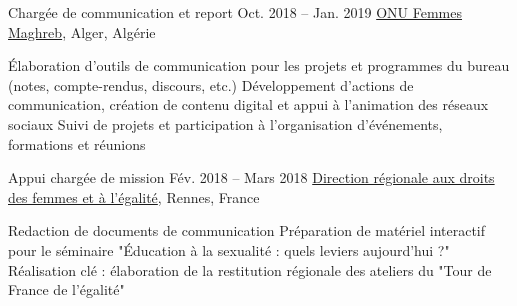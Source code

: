 \begin{joblist}

\item[Chargée de communication et report]{Oct. 2018 -- Jan. 2019 }     
	{
	\href{http://maghreb.unwomen.org/fr}{ONU Femmes Maghreb}, Alger, Algérie
	}     
	{
		\normalsize{
		\vspace{-0.5cm}
		\begin{itemize}
			  \iftbftiny \setlength\itemsep{-3pt} \fi
			  \cvitem[\checkmark] Élaboration d'outils de communication pour les projets et programmes du bureau (notes, compte-rendus, discours, etc.)     
              \cvitem[\checkmark] Développement d'actions de communication, création de contenu digital et appui à l'animation des réseaux sociaux
			  \cvitem[\checkmark] Suivi de projets et participation à l'organisation d'événements, formations et réunions 
			  
			  
			  
		\end{itemize}      
		}
	}


\item[Appui chargée de mission]{Fév. 2018 -- Mars 2018 }     
	{
	\href{https://www.egalite-femmes-hommes.gouv.fr/le-secretariat-d-etat/organisation-du-ministere/services-territoriaux/annuaire-des-equipes-regionales-et-departementales/}{Direction régionale aux droits des femmes et à l'égalité}, Rennes, France
	}     
	{
		\normalsize{
		\iftbftiny \vspace{-0.5cm} \fi
		\begin{itemize}
			  \iftbftiny \setlength\itemsep{-3pt} \fi
			  \cvitem[\checkmark] Redaction de documents de communication 
			  \cvitem[\checkmark] Préparation de matériel interactif pour le séminaire "Éducation à la sexualité : quels leviers aujourd’hui ?"
              \cvitem[\checkmark] Réalisation clé : élaboration de la restitution régionale des ateliers du "Tour de France de l’égalité"                                                            
			 

\end{itemize}}}
\end{joblist}
